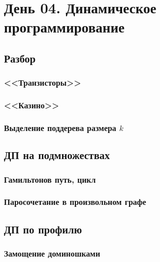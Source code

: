 \documentclass[a4paper,12pt]{article}
\begin{document}
    \section{День 04. Динамическое программирование}

      \subsection{Разбор}
        \subsubsection{<<Транзисторы>>}
        \subsubsection{<<Казино>>}
        \subsubsection{Выделение поддерева размера $k$}

      \subsection{ДП на подмножествах}
        \subsubsection{Гамильтонов путь, цикл}
        \subsubsection{Паросочетание в произвольном графе}

      \subsection{ДП по профилю}
        \subsubsection{Замощение доминошками}
\end{document}
